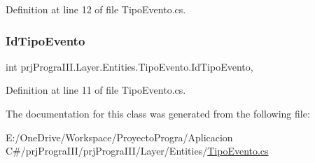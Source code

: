 Definition at line 12 of file Tipo\+Evento.\+cs.

\hypertarget{classprj_progra_i_i_i_1_1_layer_1_1_entities_1_1_tipo_evento_a81422e61a9069412070c97b4c7b2e083}{}\label{classprj_progra_i_i_i_1_1_layer_1_1_entities_1_1_tipo_evento_a81422e61a9069412070c97b4c7b2e083} 
\subsubsection{\texorpdfstring{Id\+Tipo\+Evento}{IdTipoEvento}}
{\footnotesize\ttfamily int prj\+Progra\+I\+I\+I.\+Layer.\+Entities.\+Tipo\+Evento.\+Id\+Tipo\+Evento\hspace{0.3cm}{\ttfamily [get]}, {\ttfamily [set]}}



Definition at line 11 of file Tipo\+Evento.\+cs.



The documentation for this class was generated from the following file\+:\begin{DoxyCompactItemize}
\item 
E\+:/\+One\+Drive/\+Workspace/\+Proyecto\+Progra/\+Aplicacion C\#/prj\+Progra\+I\+I\+I/prj\+Progra\+I\+I\+I/\+Layer/\+Entities/\hyperlink{_tipo_evento_8cs}{Tipo\+Evento.\+cs}\end{DoxyCompactItemize}
